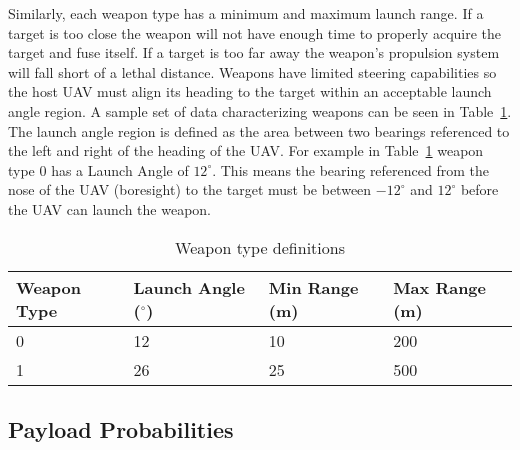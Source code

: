 
Similarly, each weapon type has a minimum and maximum launch range.  If a target is too close the weapon will not have enough time to properly acquire the target and fuse itself.  If a target is too far away the weapon's propulsion system will fall short of a lethal distance.  Weapons have limited steering capabilities so the host UAV must align its heading to the target within an acceptable launch angle region. A sample set of data characterizing weapons can be seen in Table~\ref{tab:weaponType}.  The launch angle region is defined as the area between two bearings referenced to the left and right of the heading of the UAV.  For example in Table~\ref{tab:weaponType} weapon type 0 has a Launch Angle of $12^{\circ}$.  This means the bearing referenced from the nose of the UAV (boresight) to the target must be between $-12^{\circ}$ and $12^{\circ}$ before the UAV can launch the weapon.


\begin{table}[H]
	\caption{Weapon type definitions}
	\centering
	\label{tab:weaponType}
	\begin{tabular}{|p{1.4cm}|p{1.6cm}|p{1.2cm}|p{1.2cm}|}
		\hline
		Weapon Type & Launch Angle ($^{\circ}$) & Min Range (m) & Max Range (m)\\ \hline
		0 & 12 & 10 & 200 \\ \hline
		1 & 26 & 25 & 500 \\ \hline
	\end{tabular}
\end{table}

\subsection{Payload Probabilities}
\label{sec:payload_probs}


